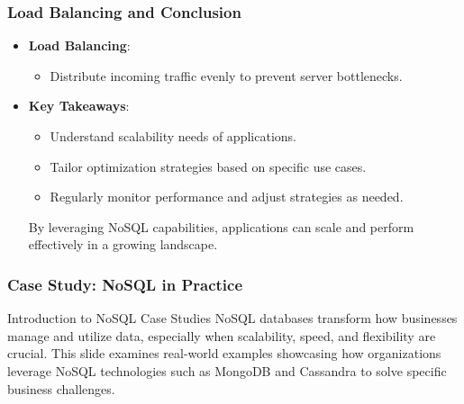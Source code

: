 \documentclass[aspectratio=169]{beamer}
\begin{document}
\begin{frame}[fragile]
  \frametitle{Load Balancing and Conclusion}
  \begin{itemize}
    \item \textbf{Load Balancing}:
      \begin{itemize}
        \item Distribute incoming traffic evenly to prevent server bottlenecks.
      \end{itemize}
      
    \item \textbf{Key Takeaways}:
      \begin{itemize}
        \item Understand scalability needs of applications.
        \item Tailor optimization strategies based on specific use cases.
        \item Regularly monitor performance and adjust strategies as needed.
      \end{itemize}
      
      By leveraging NoSQL capabilities, applications can scale and perform effectively in a growing landscape.
  \end{itemize}
\end{frame}

\begin{frame}[fragile]
  \frametitle{Case Study: NoSQL in Practice}
  \begin{block}{Introduction to NoSQL Case Studies}
    NoSQL databases transform how businesses manage and utilize data, especially when scalability, speed, and flexibility are crucial. This slide examines real-world examples showcasing how organizations leverage NoSQL technologies such as MongoDB and Cassandra to solve specific business challenges.
  \end{block}
\end{frame}
\end{document}
